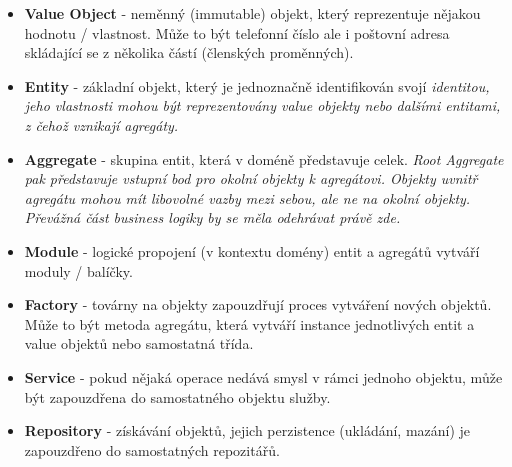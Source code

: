 \begin{itemize}
	\item \textbf{Value Object} - neměnný (immutable) objekt, který reprezentuje nějakou hodnotu / vlastnost. Může to být telefonní číslo ale i poštovní adresa skládající se z několika částí (členských proměnných).
	\item \textbf{Entity} - základní objekt, který je jednoznačně identifikován svojí \it{identitou}, jeho vlastnosti mohou být reprezentovány value objekty nebo dalšími entitami, z čehož vznikají agregáty.

	\item \textbf{Aggregate} - skupina entit, která v doméně představuje celek. \it{Root Aggregate} pak představuje vstupní bod pro okolní objekty k agregátovi. Objekty uvnitř agregátu mohou mít libovolné vazby mezi sebou, ale ne na okolní objekty. Převážná část business logiky by se měla odehrávat právě zde.
	\item \textbf{Module} - logické propojení (v kontextu domény) entit a agregátů vytváří moduly / balíčky.
	\item \textbf{Factory} - továrny na objekty zapouzdřují proces vytváření nových objektů. Může to být metoda agregátu, která vytváří instance jednotlivých entit a value objektů nebo samostatná třída.
	\item \textbf{Service} - pokud nějaká operace nedává smysl v rámci jednoho objektu, může být zapouzdřena do samostatného objektu služby.
	\item \textbf{Repository} - získávání objektů, jejich perzistence (ukládání, mazání) je zapouzdřeno do samostatných repozitářů.
\end{itemize}